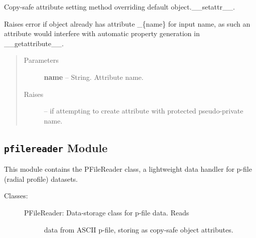 \documentclass[letterpaper,10pt,english]{sphinxmanual}
\begin{document}
\begin{fulllineitems}
\begin{fulllineitems}
\end{fulllineitems}


\begin{fulllineitems}
\label{eqtools:eqtools.afilereader.AFileReader.__setattr__}
Copy-safe attribute setting method overriding default object.\_\_setattr\_\_.

Raises error if object already has attribute \_\{name\} for input name,
as such an attribute would interfere with automatic property generation in
\_\_getattribute\_\_.
\begin{quote}\begin{description}
\item[{Parameters }] \leavevmode
\textbf{name} --
String.  Attribute name.

\item[{Raises }] \leavevmode
{} -- 
if attempting to create attribute with protected
pseudo-private name.

\end{description}\end{quote}

\end{fulllineitems}


\end{fulllineitems}



\subsection{\texttt{pfilereader} Module}
\label{eqtools:pfilereader-module}\label{eqtools:module-eqtools.pfilereader}
This module contains the PFileReader class, a lightweight data
handler for p-file (radial profile) datasets.
\begin{description}
\item[{Classes:}] \leavevmode\begin{description}
\item[{PFileReader: Data-storage class for p-file data.  Reads}] \leavevmode
data from ASCII p-file, storing as copy-safe object
attributes.

\end{description}

\end{description}
\end{document}

